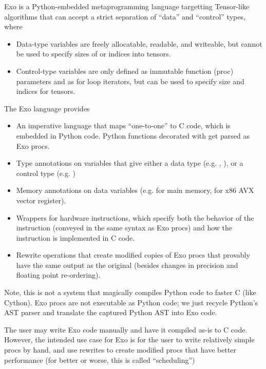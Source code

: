 




Exo is a Python-embedded metaprogramming language targetting Tensor-like algorithms that can accept a strict separation of ``data'' and ``control'' types, where
\begin{itemize}
  \item Data-type variables are freely allocatable, readable, and writeable, but cannot be used to specify sizes of or indices into tensors.
  \item Control-type variables are only defined as immutable function (proc) parameters and as for loop iterators, but can be used to specify size and indices for tensors.
\end{itemize}

\filbreak
The Exo language provides
\begin{itemize}
  \item An imperative language that maps ``one-to-one'' to C code, which is embedded in Python code.
    Python functions decorated with  get parsed as Exo procs.
  \filbreak
  \item Type annotations on variables that give either a data type (e.g. , ), or a control type (e.g. )
  \filbreak
  \item Memory annotations on data variables (e.g.  for main memory,  for x86 AVX vector register).
  \filbreak
  \item Wrappers for hardware instructions, which specify both the behavior of the instruction (conveyed in the same syntax as Exo procs) and how the instruction is implemented in C code.
  \filbreak
  \item Rewrite operations that create modified copies of Exo procs that provably have the same output as the original (besides changes in precision and floating point re-ordering).
\end{itemize}

\filbreak
Note, this is not a system that magically compiles Python code to faster C (like Cython).
Exo procs are not executable as Python code; we just recycle Python's AST parser and translate the captured Python AST into Exo code.

\filbreak
The user may write Exo code manually and have it compiled as-is to C code.
However, the intended use case for Exo is for the user to write relatively simple procs by hand, and use rewrites to create modified procs that have better performance (for better or worse, this is called ``scheduling'')

